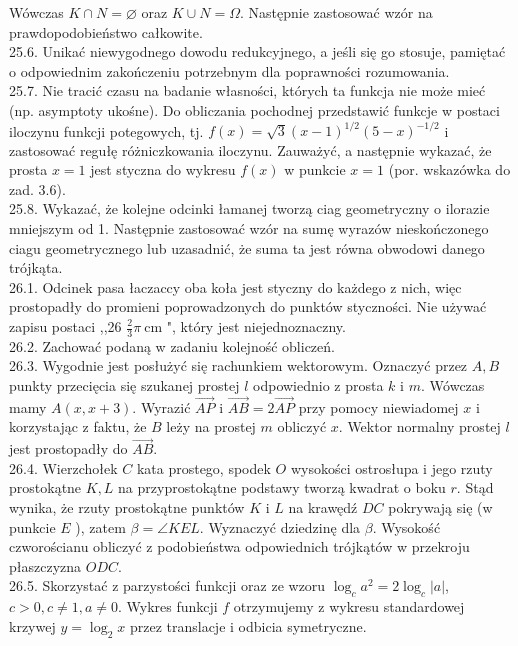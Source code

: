 \documentclass[10pt]{article}
\begin{document}
Wówczas $K \cap N=\varnothing$ oraz $K \cup N=\Omega$. Następnie zastosować wzór na prawdopodobieństwo całkowite.\\
25.6. Unikać niewygodnego dowodu redukcyjnego, a jeśli się go stosuje, pamiętać o odpowiednim zakończeniu potrzebnym dla poprawności rozumowania.\\
25.7. Nie tracić czasu na badanie własności, których ta funkcja nie może mieć (np. asymptoty ukośne). Do obliczania pochodnej przedstawić funkcje w postaci iloczynu funkcji potegowych, tj. $f(x)=\sqrt{3}(x-1)^{1 / 2}(5-x)^{-1 / 2}$ i zastosować regułę różniczkowania iloczynu. Zauważyć, a następnie wykazać, że prosta $x=1$ jest styczna do wykresu $f(x)$ w punkcie $x=1$ (por. wskazówka do zad. 3.6).\\
25.8. Wykazać, że kolejne odcinki łamanej tworzą ciag geometryczny o ilorazie mniejszym od 1. Następnie zastosować wzór na sumę wyrazów nieskończonego ciagu geometrycznego lub uzasadnić, że suma ta jest równa obwodowi danego trójkąta.\\
26.1. Odcinek pasa łaczaccy oba koła jest styczny do każdego z nich, więc prostopadły do promieni poprowadzonych do punktów styczności. Nie używać zapisu postaci ,,26 $\frac{2}{3} \pi \mathrm{~cm}$ ", który jest niejednoznaczny.\\
26.2. Zachować podaną w zadaniu kolejność obliczeń.\\
26.3. Wygodnie jest posłużyć się rachunkiem wektorowym. Oznaczyć przez $A, B$ punkty przecięcia się szukanej prostej $l$ odpowiednio z prosta $k$ i $m$. Wówczas mamy $A(x, x+3)$. Wyrazić $\overrightarrow{A P}$ i $\overrightarrow{A B}=2 \overrightarrow{A P}$ przy pomocy niewiadomej $x$ i korzystając z faktu, że $B$ leży na prostej $m$ obliczyć $x$. Wektor normalny prostej $l$ jest prostopadły do $\overrightarrow{A B}$.\\
26.4. Wierzchołek $C$ kata prostego, spodek $O$ wysokości ostrosłupa i jego rzuty prostokątne $K, L$ na przyprostokątne podstawy tworzą kwadrat o boku $r$. Stąd wynika, że rzuty prostokątne punktów $K$ i $L$ na krawędź $D C$ pokrywają się (w punkcie $E$ ), zatem $\beta=\angle K E L$. Wyznaczyć dziedzinę dla $\beta$. Wysokość czworościanu obliczyć z podobieństwa odpowiednich trójkątów w przekroju płaszczyzna $O D C$.\\
26.5. Skorzystać z parzystości funkcji oraz ze wzoru $\log _{c} a^{2}=2 \log _{c}|a|$, $c>0, c \neq 1, a \neq 0$. Wykres funkcji $f$ otrzymujemy z wykresu standardowej krzywej $y=\log _{2} x$ przez translacje i odbicia symetryczne.\\
\end{document}
